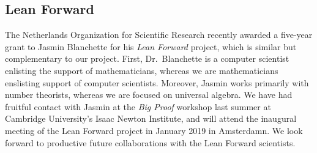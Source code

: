 \documentclass[11pt]{amsart}  %
\begin{document}
\subsection{Lean Forward}
The Netherlands Organization for Scientific Research recently awarded a five-year grant to Jasmin Blanchette for his \emph{Lean Forward} project, which is similar but complementary to our project. First, Dr.~Blanchette is a computer scientist enlisting the support of mathematicians, whereas we are mathematicians enslisting support of computer scientists.  
Moreover, Jasmin works primarily with number theorists, whereas we are focused on universal algebra. We have had fruitful contact with Jasmin at the \emph{Big Proof} workshop last summer at Cambridge University's Isaac Newton Institute, and will attend the inaugural meeting of the Lean Forward project in January 2019 in Amsterdamn. We look forward to productive future collaborations with the Lean Forward scientists.



 
\end{document}
